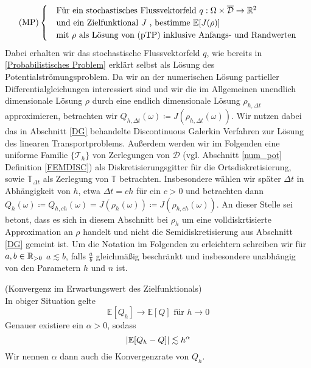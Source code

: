 \begin{align}
\text{(MP)}
\begin{cases}
\label{Modellproblem}
&\text{Für ein stochastisches Flussvektorfeld } q: \Omega \times \overline{\mathcal{D}} \to \mathbb{R}^2 \\
&\text{und ein Zielfunktional } J \text{ , bestimme }  \mathbb{E}[J(\rho)]  \\
&\text{mit } \rho \text{ als Lösung von (pTP) inklusive Anfangs- und Randwerten}
\end{cases}
\end{align} 
Dabei erhalten wir das stochastische Flussvektorfeld $ q $, wie bereits in \ref{Probabilistisches Problem} erklärt selbst als Lösung des Potentialströmungsproblem.
Da wir an der numerischen Lösung partieller Differentialgleichungen interessiert sind und wir die im Allgemeinen unendlich dimensionale Lösung $ \rho $ durch eine endlich dimensionale Lösung $ \rho_{h,\Delta t} $ approximieren, betrachten wir $ Q_{h,\Delta t}(\omega) \coloneqq J(\rho_{h,\Delta t}(\omega )) $.
Wir nutzen dabei das in Abschnitt \ref{DG} behandelte Discontinuous Galerkin Verfahren zur Lösung des linearen Transportproblems. Außerdem werden wir im Folgenden eine uniforme Familie $ \{ \mathcal{T}_h \} $ von Zerlegungen von $ \mathcal{D} $ (vgl. Abschnitt \ref{num_pot} Definition \ref{FEMDISC}) als Diskretisierungsgitter für die Ortsdiskretisierung, sowie $ \mathbb{T}_{\Delta t} $ als Zerlegung von $ \mathbb{T} $ betrachten.
Insbesondere wählen wir später $ \Delta t $ in Abhängigkeit von $ h $, etwa $ \Delta t = c  h $ für ein $ c>0 $ und betrachten dann
$ Q_h(\omega) \coloneqq Q_{h,ch}(\omega) = J(\rho_h(\omega )) \coloneqq J(\rho_{h,ch}(\omega )) $.
An dieser Stelle sei betont, dass es sich in diesem Abschnitt bei $ \rho_h $ um eine volldiskrtisierte Approximation an $ \rho $ handelt und nicht die Semidiskretisierung aus Abschnitt \ref{DG} gemeint ist. Um die Notation im Folgenden zu erleichtern schreiben wir für $ a,b \in \mathbb{R}_{> 0} $ $ a \lesssim b $, falls $\frac{a}{b}$ gleichmäßig beschränkt und insbesondere unabhängig von den Parametern $ h $ und $ n $ ist.
\begin{Annahme}(Konvergenz im Erwartungswert des Zielfunktionals)\\
	\label{Annahme1}
	In obiger Situation gelte 
	\[ 
	\mathbb{E}[Q_h] \to \mathbb{E}[Q] \text{ für } h \to 0   
	\]
	Genauer existiere ein $ \alpha > 0 $, sodass
	\[
		| \mathbb{E}[Q_h-Q] | \lesssim h^{\alpha}
	\]
	Wir nennen $ \alpha $ dann auch die Konvergenzrate von $ Q_h $.
\end{Annahme}


